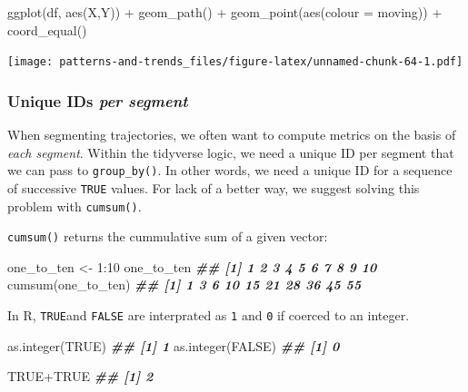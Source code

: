 \documentclass[
]{book}
\newenvironment{Shaded}{\begin{snugshade}}{\end{snugshade}}
\newcommand{\AttributeTok}[1]{\textcolor[rgb]{0.77,0.63,0.00}{#1}}
\newcommand{\ConstantTok}[1]{\textcolor[rgb]{0.00,0.00,0.00}{#1}}
\newcommand{\DecValTok}[1]{\textcolor[rgb]{0.00,0.00,0.81}{#1}}
\newcommand{\DocumentationTok}[1]{\textcolor[rgb]{0.56,0.35,0.01}{\textbf{\textit{#1}}}}
\newcommand{\FunctionTok}[1]{\textcolor[rgb]{0.00,0.00,0.00}{#1}}
\newcommand{\NormalTok}[1]{#1}
\newcommand{\OtherTok}[1]{\textcolor[rgb]{0.56,0.35,0.01}{#1}}
\newcommand{\SpecialCharTok}[1]{\textcolor[rgb]{0.00,0.00,0.00}{#1}}
\begin{document}
\begin{Shaded}
\begin{Highlighting}[]
\FunctionTok{ggplot}\NormalTok{(df, }\FunctionTok{aes}\NormalTok{(X,Y)) }\SpecialCharTok{+}
  \FunctionTok{geom\_path}\NormalTok{() }\SpecialCharTok{+} 
  \FunctionTok{geom\_point}\NormalTok{(}\FunctionTok{aes}\NormalTok{(}\AttributeTok{colour =}\NormalTok{ moving)) }\SpecialCharTok{+}
  \FunctionTok{coord\_equal}\NormalTok{()}
\end{Highlighting}
\end{Shaded}

\texttt{[image: patterns-and-trends\_files/figure-latex/unnamed-chunk-64-1.pdf]}

\hypertarget{unique-ids-per-segment}{%
\subsubsection{\texorpdfstring{Unique IDs \emph{per segment}}{Unique IDs per segment}}\label{unique-ids-per-segment}}

When segmenting trajectories, we often want to compute metrics on the basis of \emph{each segment}. Within the tidyverse logic, we need a unique ID per segment that we can pass to \texttt{group\_by()}. In other words, we need a unique ID for a sequence of successive \texttt{TRUE} values. For lack of a better way, we suggest solving this problem with \texttt{cumsum()}.

\texttt{cumsum()} returns the cummulative sum of a given vector:

\begin{Shaded}
\begin{Highlighting}[]
\NormalTok{one\_to\_ten }\OtherTok{\textless{}{-}} \DecValTok{1}\SpecialCharTok{:}\DecValTok{10}
\NormalTok{one\_to\_ten}
\DocumentationTok{\#\#  [1]  1  2  3  4  5  6  7  8  9 10}
\FunctionTok{cumsum}\NormalTok{(one\_to\_ten)}
\DocumentationTok{\#\#  [1]  1  3  6 10 15 21 28 36 45 55}
\end{Highlighting}
\end{Shaded}

In R, \texttt{TRUE}and \texttt{FALSE} are interprated as \texttt{1} and \texttt{0} if coerced to an integer.

\begin{Shaded}
\begin{Highlighting}[]
\FunctionTok{as.integer}\NormalTok{(}\ConstantTok{TRUE}\NormalTok{)}
\DocumentationTok{\#\# [1] 1}
\FunctionTok{as.integer}\NormalTok{(}\ConstantTok{FALSE}\NormalTok{)}
\DocumentationTok{\#\# [1] 0}

\ConstantTok{TRUE}\SpecialCharTok{+}\ConstantTok{TRUE}
\DocumentationTok{\#\# [1] 2}
\end{Highlighting}
\end{Shaded}
\end{document}
